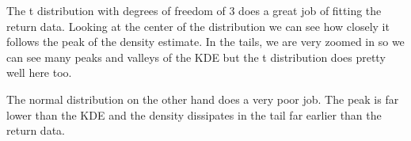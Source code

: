 \documentclass[
  letterpaper,
  DIV=11,
  numbers=noendperiod]{scrartcl}
\begin{document}
The t distribution with degrees of freedom of 3 does a great job of
fitting the return data. Looking at the center of the distribution we
can see how closely it follows the peak of the density estimate. In the
tails, we are very zoomed in so we can see many peaks and valleys of the
KDE but the t distribution does pretty well here too.

The normal distribution on the other hand does a very poor job. The peak
is far lower than the KDE and the density dissipates in the tail far
earlier than the return data.
\end{document}
